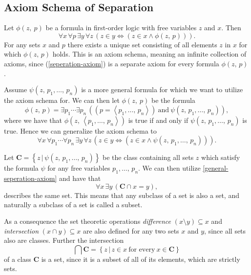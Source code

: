 \documentclass[../../main.tex]{subfiles}
\begin{document}
\subsection{Axiom Schema of Separation}\label{ZF3}
Let $\phi(z,\ p)$ be a formula in first-order logic with free variables $z$ and $x$. Then
\begin{equation}\label{seperation-axiom}
    \forall x\, \forall p\, \exists y\, \forall z\, \left(z \in y \iff \left(z \in x \wedge \phi(z,\, p)\right)\right).
\end{equation}
For any sets $x$ and $p$ there exists a unique set consisting of all elements $z$ in $x$ for which $\phi(z,\, p)$ holds.
This is an axiom schema, meaning an infinite collection of axioms, since (\ref{seperation-axiom}) is a separate axiom for every formula $\phi(z,\, p)$.

Assume $\psi(z,\, p_1,\ldots,\, p_n)$ is a more general formula for which we want to utilize the axiom schema for.
We can then let $\phi(z,\ p)$ be the formula
$$\phi(z,\, p) = \exists p_1 \cdots \exists p_n\, \left(\left(p = \left<p_1,\ldots,\, p_n\right>\right) \ \text{and} \ \psi(z,\, p_1,\ldots,\, p_n)\right),$$
where we have that $\phi(z,\, \left<p_1,\ldots,\, p_n\right>)$ is true if and only if $\psi(z,\, p_1,\ldots,\, p_n)$ is true.
Hence we can generalize the axiom schema to 
\begin{equation}\label{general-seperation-axiom}
    \forall x\, \forall p_1 \cdots \forall p_n\, \exists y\, \forall z\, \left(z \in y \iff \left(z \in x \wedge \psi(z,\, p_1,\ldots,\, p_n)\right)\right).
\end{equation}

Let $\mathbf{C} = \left\{z \,\vert\, \psi(z,\, p_1,\ldots,\, p_n)\right\}$ be the class containing all sets $z$ which satisfy the formula $\psi$ for any free variables $p_1,\ldots,\, p_n$.
We can then utilize \eqref{general-seperation-axiom} and have that
$$\forall x \, \exists y \, \left(\mathbf{C} \cap x = y\right),$$
describes the same set.
This means that any subclass of a set is also a set, and naturally a subclass of a set is called a subset. 

As a consequence the set theoretic operations \textit{difference} $\left(x \setminus y\right) \subseteq x$ and \textit{intersection} $\left(x \cap y\right) \subseteq x$ are also defined for any two sets $x$ and $y$,
since all sets also are classes.
Further the intersection 
$$\bigcap \mathbf{C} = \left\{z \,\vert\, z \in x \ \text{for every}\ x \in \mathbf{C}\right\}$$
of a class $\mathbf{C}$ is a set, since it is a subset of all of its elements, which are strictly sets. \cite[pp.5-6]{Jec78}
\end{document}

